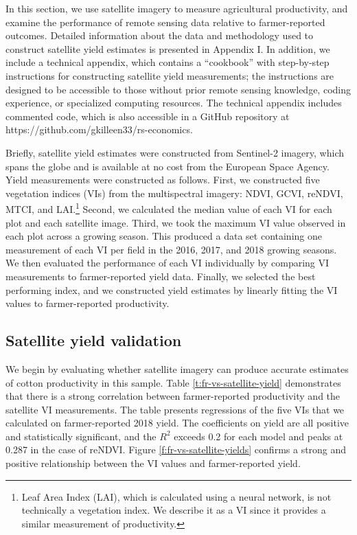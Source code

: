 \documentclass{article}
\begin{document}
In this section, we use satellite imagery to measure agricultural productivity, and examine the performance of remote sensing data relative to farmer-reported outcomes. Detailed information about the data and methodology used to construct satellite yield estimates is presented in Appendix I. In addition, we include a technical appendix, which contains a “cookbook” with step-by-step instructions for constructing satellite yield measurements; the instructions are designed to be accessible to those without prior remote sensing knowledge, coding experience, or specialized computing resources. The technical appendix includes commented code, which is also accessible in a GitHub repository at https://github.com/gkilleen33/rs-economics. 

Briefly, satellite yield estimates were constructed from Sentinel-2 imagery, which spans the globe and is available at no cost from the European Space Agency. Yield measurements were constructed as follows. First, we constructed five vegetation indices (VIs) from the multispectral imagery: NDVI, GCVI, reNDVI, MTCI, and LAI.\footnote{Leaf Area Index (LAI), which is calculated using a neural network, is not technically a vegetation index. We describe it as a VI since it provides a similar measurement of productivity.} Second, we calculated the median value of each VI for each plot and each satellite image. Third, we took the maximum VI value observed in each plot across a growing season. This produced a data set containing one measurement of each VI per field in the 2016, 2017, and 2018 growing seasons. We then evaluated the performance of each VI individually by comparing VI measurements to farmer-reported yield data. Finally, we selected the best performing index, and we constructed yield estimates by linearly fitting the VI values to farmer-reported productivity. 

\subsection{Satellite yield validation} \label{section:satellite-validation}

We begin by evaluating whether satellite imagery can produce accurate estimates of cotton productivity in this sample. Table \ref{t:fr-vs-satellite-yield} demonstrates that there is a strong correlation between farmer-reported productivity and the satellite VI measurements. The table presents regressions of the five VIs that we calculated on farmer-reported 2018 yield. The coefficients on yield are all positive and statistically significant, and the $R^2$ exceeds 0.2 for each model and peaks at 0.287 in the case of reNDVI. Figure \ref{f:fr-vs-satellite-yields} confirms a strong and positive relationship between the VI values and farmer-reported yield. 
\end{document}
